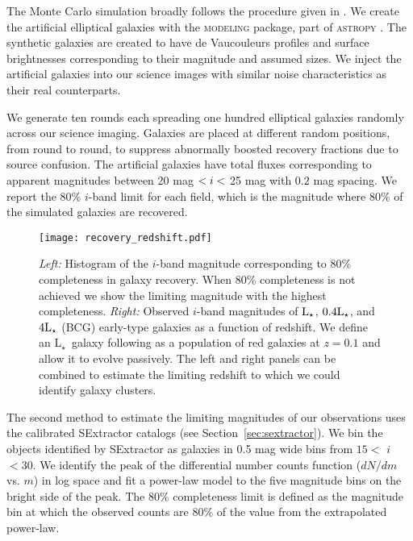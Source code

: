 \documentclass[apj, revtex4-1]{emulateapj}
\newcommand{\sdssi}{\hbox{$i$}}
\newcommand{\lstar}{\hbox{L$_{\star}$}}
\begin{document}
The Monte Carlo simulation broadly follows the procedure given in \cite{Menanteau2010a}. We create the artificial elliptical galaxies with the \textsc{modeling} package, part of \textsc{astropy} \citep{TheAstropyCollaboration2013}. The synthetic galaxies are created to have de Vaucouleurs \citep{DeVaucouleurs1948} profiles and surface brightnesses corresponding to their magnitude and assumed sizes. We inject the artificial galaxies into our science images with similar noise characteristics as their real counterparts.

We generate ten rounds each spreading one hundred elliptical galaxies randomly across our science imaging. Galaxies are placed at different random positions, from round to round, to suppress abnormally boosted recovery fractions due to source confusion. The artificial galaxies have total fluxes corresponding to apparent magnitudes between 20 mag $< \sdssi <$ 25 mag with $0.2$ mag spacing. We report the 80\% \sdssi-band limit for each field, which is the magnitude where 80\% of the simulated galaxies are recovered.

\begin{figure*}
	\centering
	\texttt{[image: recovery\_redshift.pdf]}
	\caption{\textit{Left:} Histogram of the \sdssi-band magnitude corresponding to 80\% completeness in galaxy recovery. When 80\% completeness is not achieved we show the limiting magnitude with the highest completeness. \textit{Right:} Observed \sdssi-band magnitudes of $\lstar$, $0.4\lstar$, and $4\lstar$ (BCG) early-type galaxies as a function of redshift. We define an \lstar\ galaxy following \cite{Blanton2003} as a population of red galaxies at $z = 0.1$ and allow it to evolve passively. The left and right panels can be combined to estimate the limiting redshift to which we could identify galaxy clusters.}
	\label{fig:recovery_redshift}
\end{figure*}

The second method to estimate the limiting magnitudes of our observations uses the calibrated SExtractor catalogs (see Section~\ref{sec:sextractor}). We bin the objects identified by SExtractor as galaxies in 0.5 mag wide bins from $15<$ \sdssi\ $<30$. We identify the peak of the differential number counts function ($dN/dm$ vs. $m$) in log space and fit a power-law model to the five magnitude bins on the bright side of the peak. The 80\% completeness limit is defined as the magnitude bin at which the observed counts are 80\% of the value from the extrapolated power-law.
\end{document}
